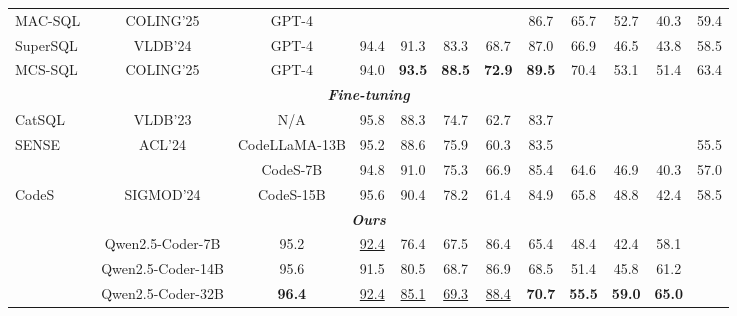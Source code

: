 \begin{table}[!t]
{\begin{tabular}{l|c|c|ccccc|cccc}
\rowcolor[HTML]{EDEDED}
MAC-SQL~\citep{MAC-SQL} & COLING'25 & GPT-4 &  &  &  &  & 86.7 & 65.7 & 52.7 & 40.3 & 59.4 \\
SuperSQL~\citep{SuperSQL} & VLDB'24 & GPT-4 & 94.4 & 91.3 & 83.3 & 68.7 & 87.0 & 66.9 & 46.5 & 43.8 & 58.5 \\
\rowcolor[HTML]{EDEDED}
MCS-SQL~\citep{MCS-SQL} & COLING'25 & GPT-4 & 94.0 & \textbf{93.5} & \textbf{88.5} & \textbf{72.9} & \textbf{89.5} & 70.4 & 53.1 & 51.4 & 63.4 \\
\midrule
\multicolumn{12}{c}{\textit{\textbf{Fine-tuning}}} \\
\midrule
CatSQL~\citep{CatSQL} & VLDB'23 & N/A & 95.8 & 88.3 & 74.7 & 62.7 & 83.7 &  &  &  &  \\
\rowcolor[HTML]{EDEDED}
SENSE~\citep{SENSE} & ACL'24 & CodeLLaMA-13B & 95.2 & 88.6 & 75.9 & 60.3 & 83.5 &  &  &  & 55.5 \\
 &  & CodeS-7B & 94.8 & 91.0 & 75.3 & 66.9 & 85.4 & 64.6 & 46.9 & 40.3 & 57.0 \\
\multirow{-2}{*}{CodeS~\citep{CodeS}} & \multirow{-2}{*}{SIGMOD'24} & CodeS-15B & 95.6 & 90.4 & 78.2 & 61.4 & 84.9 & 65.8 & 48.8 & 42.4 & 58.5 \\
\midrule
\multicolumn{12}{c}{\textit{\textbf{Ours}}} \\
\midrule
\rowcolor[HTML]{DBDBDB}
\multicolumn{2}{l}{\cellcolor[HTML]{DBDBDB}} & Qwen2.5-Coder-7B & 95.2 & \underline{92.4} & 76.4 & 67.5 & 86.4 & 65.4 & 48.4 & 42.4 & 58.1 \\
\rowcolor[HTML]{DBDBDB}
\multicolumn{2}{l}{\cellcolor[HTML]{DBDBDB}} & Qwen2.5-Coder-14B & 95.6 & 91.5 & 80.5 & 68.7 & 86.9 & 68.5 & 51.4 & 45.8 & 61.2 \\
\rowcolor[HTML]{DBDBDB}
\multicolumn{2}{l}{\multirow{-3}{*}{\cellcolor[HTML]{DBDBDB}LearnNAT}} & Qwen2.5-Coder-32B & \textbf{96.4} & \underline{92.4} & \underline{85.1} & \underline{69.3} & \underline{88.4} & \textbf{70.7} & \textbf{55.5} & \textbf{59.0} & \textbf{65.0} \\
\bottomrule
\end{tabular}
}
\end{table}
